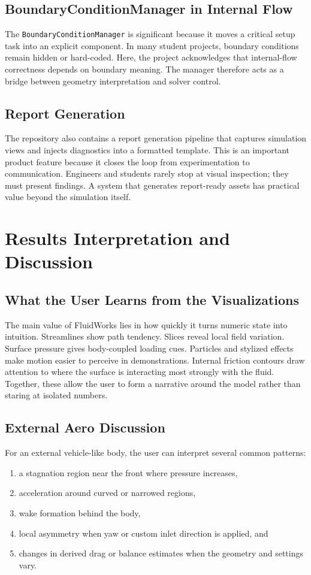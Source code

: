 \documentclass[12pt,a4paper,titlepage]{report}
\begin{document}
\section{BoundaryConditionManager in Internal Flow}
The \texttt{BoundaryConditionManager} is significant because it moves a critical setup task into an explicit component. In many student projects, boundary conditions remain hidden or hard-coded. Here, the project acknowledges that internal-flow correctness depends on boundary meaning. The manager therefore acts as a bridge between geometry interpretation and solver control.

\section{Report Generation}
The repository also contains a report generation pipeline that captures simulation views and injects diagnostics into a formatted template. This is an important product feature because it closes the loop from experimentation to communication. Engineers and students rarely stop at visual inspection; they must present findings. A system that generates report-ready assets has practical value beyond the simulation itself.

\chapter{Results Interpretation and Discussion}
\section{What the User Learns from the Visualizations}
The main value of FluidWorks lies in how quickly it turns numeric state into intuition. Streamlines show path tendency. Slices reveal local field variation. Surface pressure gives body-coupled loading cues. Particles and stylized effects make motion easier to perceive in demonstrations. Internal friction contours draw attention to where the surface is interacting most strongly with the fluid. Together, these allow the user to form a narrative around the model rather than staring at isolated numbers.

\section{External Aero Discussion}
For an external vehicle-like body, the user can interpret several common patterns:
\begin{enumerate}
\item a stagnation region near the front where pressure increases,
\item acceleration around curved or narrowed regions,
\item wake formation behind the body,
\item local asymmetry when yaw or custom inlet direction is applied, and
\item changes in derived drag or balance estimates when the geometry and settings vary.
\end{enumerate}
\end{document}

